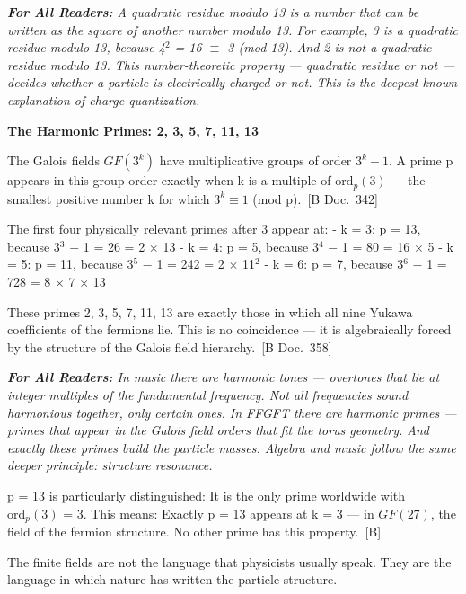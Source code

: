 \documentclass[11pt,oneside]{book}
\newcommand{\status}[1]{\penalty10000\,{\scriptsize\textcolor{gray!60}{[#1]}}}
\newenvironment{laierspur}{%
  \par\vspace{4pt}%
  \noindent\small\itshape\color{blue!60!black}%
  \textbf{For All Readers:}\enspace\ignorespaces}{%
  \par\vspace{4pt}\normalsize\normalfont\normalcolor}
\begin{document}
\begin{laierspur}
A quadratic residue modulo 13 is a number that can be written as the
square of another number modulo 13. For example, 3 is a quadratic residue
modulo 13, because 4$^2$ = 16 $\equiv$ 3 (mod 13). And 2 is not a quadratic
residue modulo 13. This number-theoretic property — quadratic residue or not —
decides whether a particle is electrically charged or not. This is the
deepest known explanation of charge quantization.
\end{laierspur}

\textbf{The Harmonic Primes: {2, 3, 5, 7, 11, 13}}

The Galois fields $GF(3^k)$ have multiplicative groups of order $3^k - 1$.
A prime p appears in this group order exactly when k is a multiple of
$\text{ord}_p(3)$ — the smallest positive number k for which $3^k \equiv 1$ (mod p). \status{B Doc.~342}

The first four physically relevant primes after 3 appear at:
- k = 3: p = 13, because 3$^3$ $-$ 1 = 26 = 2 $\times$ 13
- k = 4: p = 5, because 3$^4$ $-$ 1 = 80 = 16 $\times$ 5
- k = 5: p = 11, because 3$^5$ $-$ 1 = 242 = 2 $\times$ 11$^2$
- k = 6: p = 7, because 3$^6$ $-$ 1 = 728 = 8 $\times$ 7 $\times$ 13

These primes {2, 3, 5, 7, 11, 13} are exactly those in which all nine Yukawa
coefficients of the fermions lie. This is no coincidence — it is
algebraically forced by the structure of the Galois field hierarchy.
\status{B Doc.~358}

\begin{laierspur}
In music there are harmonic tones — overtones that lie at integer
multiples of the fundamental frequency. Not all frequencies sound harmonious
together, only certain ones. In FFGFT there are harmonic primes — primes
that appear in the Galois field orders that fit the torus geometry. And
exactly these primes build the particle masses. Algebra and music follow the
same deeper principle: structure resonance.
\end{laierspur}

p = 13 is particularly distinguished: It is the only prime worldwide with
$\text{ord}_p(3)$ = 3. This means: Exactly p = 13 appears at k = 3 — in
$GF(27)$, the field of the fermion structure. No other prime has this property. \status{B}

The finite fields are not the language that physicists usually speak. They
are the language in which nature has written the particle structure.
\end{document}
